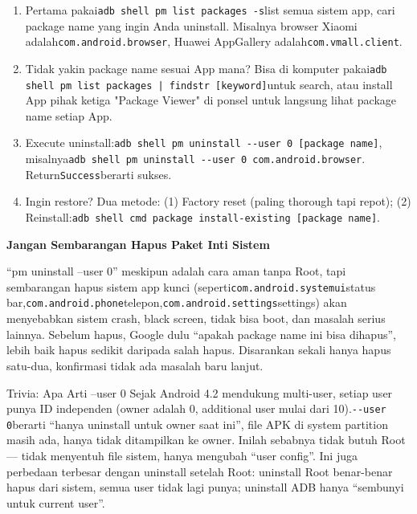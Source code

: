 \begin{enumerate}
  \item Pertama pakai\texttt{adb shell pm list packages -\allowbreak s}list semua sistem app, cari package name yang ingin Anda uninstall. Misalnya browser Xiaomi adalah\texttt{com.\allowbreak android.\allowbreak browser}, Huawei AppGallery adalah\texttt{com.\allowbreak vmall.\allowbreak client}.
  \item Tidak yakin package name sesuai App mana? Bisa di komputer pakai\texttt{adb shell pm list packages | findstr [keyword]}untuk search, atau install App pihak ketiga "Package Viewer" di ponsel untuk langsung lihat package name setiap App.
  \item Execute uninstall:\texttt{adb shell pm uninstall -\allowbreak -\allowbreak user 0 [package name]}, misalnya\texttt{adb shell pm uninstall -\allowbreak -\allowbreak user 0 com.\allowbreak android.\allowbreak browser}. Return\texttt{Success}berarti sukses.
  \item Ingin restore? Dua metode: (1) Factory reset (paling thorough tapi repot); (2) Reinstall:\texttt{adb shell cmd package install-\allowbreak existing [package name]}.
\end{enumerate}

\textbf{Jangan Sembarangan Hapus Paket Inti Sistem}\par

“pm uninstall --user 0” meskipun adalah cara aman tanpa Root, tapi sembarangan hapus sistem app kunci (seperti\texttt{com.\allowbreak android.\allowbreak systemui}status bar,\texttt{com.\allowbreak android.\allowbreak phone}telepon,\texttt{com.\allowbreak android.\allowbreak settings}settings) akan menyebabkan sistem crash, black screen, tidak bisa boot, dan masalah serius lainnya. Sebelum hapus, Google dulu “apakah package name ini bisa dihapus”, lebih baik hapus sedikit daripada salah hapus. Disarankan sekali hanya hapus satu-dua, konfirmasi tidak ada masalah baru lanjut.

\begin{tcbinfo}{Trivia: Apa Arti --user 0}
Sejak Android 4.2 mendukung multi-user, setiap user punya ID independen (owner adalah 0, additional user mulai dari 10).\texttt{-\allowbreak -\allowbreak user 0}berarti “hanya uninstall untuk owner saat ini”, file APK di system partition masih ada, hanya tidak ditampilkan ke owner. Inilah sebabnya tidak butuh Root — tidak menyentuh file sistem, hanya mengubah “user config”. Ini juga perbedaan terbesar dengan uninstall setelah Root: uninstall Root benar-benar hapus dari sistem, semua user tidak lagi punya; uninstall ADB hanya “sembunyi untuk current user”.

\end{tcbinfo}

